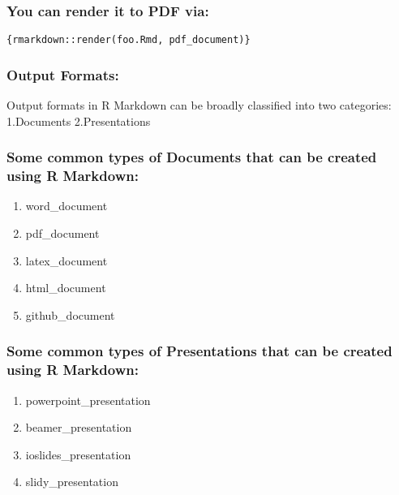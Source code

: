 \documentclass[
]{article}
\providecommand{\tightlist}{%
  \setlength{\itemsep}{0pt}\setlength{\parskip}{0pt}}
\begin{document}
\hypertarget{you-can-render-it-to-pdf-via}{%
\subsubsection{You can render it to PDF
via:}\label{you-can-render-it-to-pdf-via}}

\texttt{\{rmarkdown::render(\textquotesingle{}foo.Rmd\textquotesingle{},\ \textquotesingle{}pdf\_document\textquotesingle{})\}}

\hypertarget{output-formats}{%
\subsubsection{Output Formats:}\label{output-formats}}

Output formats in R Markdown can be broadly classified into two
categories:\\
1.Documents 2.Presentations

\hypertarget{some-common-types-of-documents-that-can-be-created-using-r-markdown}{%
\subsubsection{Some common types of Documents that can be created using
R
Markdown:}\label{some-common-types-of-documents-that-can-be-created-using-r-markdown}}

\begin{enumerate}
\def\labelenumi{\arabic{enumi}.}
\tightlist
\item
  word\_document
\item
  pdf\_document
\item
  latex\_document
\item
  html\_document
\item
  github\_document
\end{enumerate}

\hypertarget{some-common-types-of-presentations-that-can-be-created-using-r-markdown}{%
\subsubsection{Some common types of Presentations that can be created
using R
Markdown:}\label{some-common-types-of-presentations-that-can-be-created-using-r-markdown}}

\begin{enumerate}
\def\labelenumi{\arabic{enumi}.}
\tightlist
\item
  powerpoint\_presentation
\item
  beamer\_presentation
\item
  ioslides\_presentation
\item
  slidy\_presentation
\end{enumerate}
\end{document}

